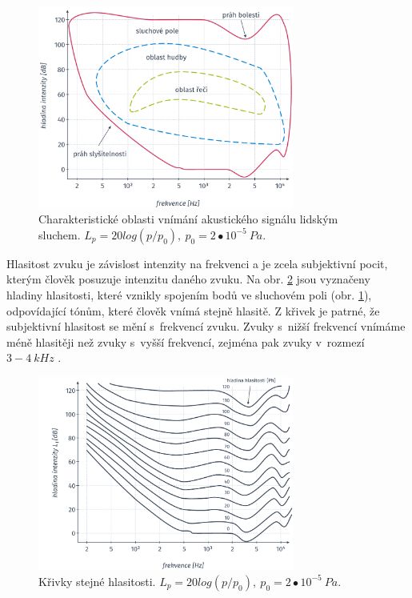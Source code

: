 \begin{figure}[hbpt]
  \centering
  \includegraphics[width=0.75\textwidth]{./ch4-asr/img/listening_perception.pdf}
  \caption[Charakteristické oblasti vnímání akustického signálu.]{Charakteristické oblasti vnímání akustického signálu lidským sluchem. $L_p = 20log(p/p_0),\ p_0 = 2\bullet10^{-5}\ Pa$.}
  \label{fig:asr:mfcc:acoustic:characteristic}
\end{figure}

Hlasitost zvuku je závislost intenzity na frekvenci a je zcela subjektivní pocit, kterým člověk posuzuje intenzitu daného zvuku. Na obr. \ref{fig:asr:mfcc:acoustic:levels} jsou vyznačeny hladiny hlasitosti, které vznikly spojením bodů ve sluchovém poli (obr. \ref{fig:asr:mfcc:acoustic:characteristic}), odpovídající tónům, které člověk vnímá stejně hlasitě. Z křivek je patrné, že subjektivní hlasitost se mění s~frekvencí zvuku. Zvuky s~nižší frekvencí vnímáme méně hlasitěji než zvuky s~vyšší frekvencí, zejména pak zvuky v~rozmezí $3 - 4\ kHz$ \cite{Psutka2006}.

\begin{figure}[hbpt]
  \centering
  \includegraphics[width=0.75\textwidth]{./ch4-asr/img/listening_levels.pdf}
  \caption[Křívky stejné hlasitosti.]{Křivky stejné hlasitosti. $L_p = 20log(p/p_0),\ p_0 = 2\bullet10^{-5}\ Pa$.}
  \label{fig:asr:mfcc:acoustic:levels}
\end{figure}


